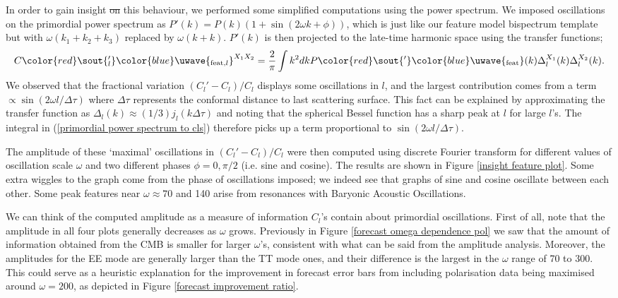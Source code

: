\documentclass[a4paper,12pt,times,custombib,print,index]{Classes/PhDThesisPSnPDF} %
\providecommand{\DIFadd}[1]{{\protect\color{blue}\uwave{#1}}} %
\providecommand{\DIFdel}[1]{{\protect\color{red}\sout{#1}}}                      %
\providecommand{\DIFaddbegin}{} %
\providecommand{\DIFaddend}{} %
\providecommand{\DIFdelbegin}{} %
\providecommand{\DIFdelend}{} %
\newcommand{\DIFscaledelfig}{0.5}
\newlength{\DIFdelgraphicswidth} %
\newlength{\DIFdelgraphicsheight} %
\newcommand{\DIFaddincludegraphics}[2][]{{\color{blue}\fbox{\DIFOincludegraphics[#1]{#2}}}} %
\newcommand{\DIFdelincludegraphics}[2][]{%
\sbox{\DIFdelgraphicsbox}{\DIFOincludegraphics[#1]{#2}}%
\settoboxwidth{\DIFdelgraphicswidth}{\DIFdelgraphicsbox} %
\settoboxtotalheight{\DIFdelgraphicsheight}{\DIFdelgraphicsbox} %
\scalebox{\DIFscaledelfig}{%
\parbox[b]{\DIFdelgraphicswidth}{\usebox{\DIFdelgraphicsbox}\\[-\baselineskip] \rule{\DIFdelgraphicswidth}{0em}}\llap{\resizebox{\DIFdelgraphicswidth}{\DIFdelgraphicsheight}{%
\setlength{\unitlength}{\DIFdelgraphicswidth}%
\begin{picture}(1,1)%
\thicklines\linethickness{2pt} %
{\color[rgb]{1,0,0}\put(0,0){\framebox(1,1){}}}%
{\color[rgb]{1,0,0}\put(0,0){\line( 1,1){1}}}%
{\color[rgb]{1,0,0}\put(0,1){\line(1,-1){1}}}%
\end{picture}%
}\hspace*{3pt}}} %
} %
\DeclareRobustCommand{\DIFaddbegin}{\DIFOaddbegin \let\includegraphics\DIFaddincludegraphics} %
\DeclareRobustCommand{\DIFaddend}{\DIFOaddend \let\includegraphics\DIFOincludegraphics} %
\DeclareRobustCommand{\DIFdelbegin}{\DIFOdelbegin \let\includegraphics\DIFdelincludegraphics} %
\DeclareRobustCommand{\DIFdelend}{\DIFOaddend \let\includegraphics\DIFOincludegraphics} %
\begin{document}
In order to gain insight \DIFdelbegin \DIFdel{on }\DIFdelend \DIFaddbegin \DIFadd{into }\DIFaddend this behaviour, we performed some simplified computations using the power spectrum. We imposed oscillations on the primordial power spectrum as \DIFdelbegin \DIFdel{$P'(k) = P(k)(1+\sin(2\omega k + \phi))$}\DIFdelend \DIFaddbegin \DIFadd{$P_\textrm{feat}(k) = P(k)(1+\sin(2\omega k + \phi))$}\DIFaddend , which is just like our feature model bispectrum template but with $\omega(k_1+k_2+k_3)$ replaced by $\omega(k+k)$. \DIFdelbegin \DIFdel{$P'(k)$ }\DIFdelend \DIFaddbegin \DIFadd{$P_\textrm{feat}(k)$ }\DIFaddend is then projected to the late-time harmonic space using the transfer functions;
\begin{equation}
	C\DIFdelbegin \DIFdel{_l'}\DIFdelend \DIFaddbegin \DIFadd{_{\text{feat},l}}\DIFaddend ^{X_1 X_2} = \frac{2}{\pi} \int k^2 dk P\DIFdelbegin \DIFdel{'}\DIFdelend \DIFaddbegin \DIFadd{_\textrm{feat}}\DIFaddend (k) \Delta_l^{X_1}(k) \Delta_l^{X_2}(k).
	\label{primordial power spectrum to cls}
\end{equation}
We observed that the fractional variation \DIFdelbegin \DIFdel{$(C_l'-C_l)/C_l$ }\DIFdelend \DIFaddbegin \DIFadd{$(C_{\text{feat},l}-C_l)/C_l$ }\DIFaddend displays some oscillations in $l$, and the largest contribution comes from a term $\propto \sin(2\omega l/\Delta\tau)$ where $\Delta\tau$ represents the conformal distance to \DIFaddbegin \DIFadd{the }\DIFaddend last scattering surface. This fact can be explained by approximating the transfer function as $\Delta_l(k)\approx (1/3)j_l(k\Delta\tau)$ and noting that the spherical Bessel function has a sharp peak at $l$ for large $l$'s. The integral in (\ref{primordial power spectrum to cls}) therefore picks up a term proportional to $\sin(2\omega l/\Delta\tau)$.

The amplitude of these `maximal' oscillations in $(C_l'-C_l)/C_l$ were then computed using discrete Fourier transform for different values of oscillation scale $\omega$ and two different phases $\phi=0,\pi/2$ (i.e. sine and cosine). The results are shown in Figure \ref{insight feature plot}. Some extra wiggles to the graph come from the phase of oscillations imposed; we indeed see that graphs of sine and cosine oscillate between each other. Some peak features near $\omega\approx70$ and 140 arise from resonances with Baryonic Acoustic Oscillations.

We can think of the computed amplitude as a measure of information $C_l$'s contain about \DIFaddbegin \DIFadd{the }\DIFaddend primordial oscillations. First of all, note that the amplitude in all four plots generally decreases as $\omega$ grows. Previously in Figure \ref{forecast omega dependence pol} we saw that the amount of information obtained from the CMB is smaller for larger $\omega$'s, consistent with what can be said from the amplitude analysis. Moreover, the amplitudes for the EE mode are generally larger than the TT mode ones, and their difference is the largest in the $\omega$ range of 70 to 300. This could serve as a heuristic explanation for the improvement in forecast error bars from including polarisation data being maximised around $\omega=200$, as depicted in Figure \ref{forecast improvement ratio}.
\end{document}
